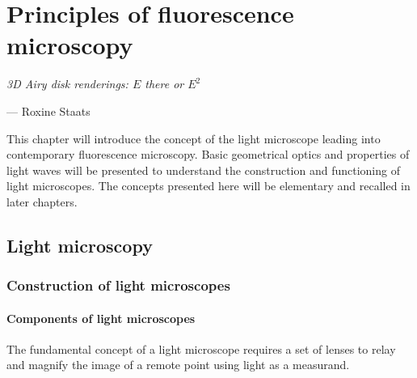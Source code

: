 

\chapter{Principles of fluorescence microscopy}
\epigraph{\emph{3D Airy disk renderings: $E$ there or $E^2$}}{--- Roxine Staats}

This chapter will introduce the concept of the light microscope leading into contemporary fluorescence microscopy.
Basic geometrical optics and properties of light waves will be presented to understand the construction and functioning of light microscopes.
The concepts presented here will be elementary and recalled in later chapters.
\pagebreak
\section{Light microscopy}

\subsection{Construction of light microscopes}


\subsubsection{Components of light microscopes}
The fundamental concept of a light microscope requires a set of lenses to relay and magnify the image of a remote point using light as a measurand.

